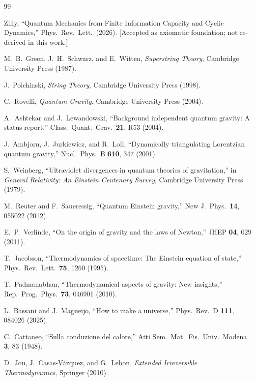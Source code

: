 \documentclass[aps,prd,twocolumn,showpacs,superscriptaddress,preprintnumbers]{revtex4-2}
\begin{document}
\begin{thebibliography}{99}

Zilly, ``Quantum Mechanics from Finite Information Capacity and Cyclic Dynamics,''
Phys.\ Rev.\ Lett.\ (2026).
[Accepted as axiomatic foundation; not re-derived in this work.]

M.~B.~Green, J.~H.~Schwarz, and E.~Witten,
\textit{Superstring Theory},
Cambridge University Press (1987).

J.~Polchinski,
\textit{String Theory},
Cambridge University Press (1998).

C.~Rovelli,
\textit{Quantum Gravity},
Cambridge University Press (2004).

A.~Ashtekar and J.~Lewandowski,
``Background independent quantum gravity: A status report,''
Class.\ Quant.\ Grav.\ \textbf{21}, R53 (2004).

J.~Ambjorn, J.~Jurkiewicz, and R.~Loll,
``Dynamically triangulating Lorentzian quantum gravity,''
Nucl.\ Phys.\ B \textbf{610}, 347 (2001).

S.~Weinberg,
``Ultraviolet divergences in quantum theories of gravitation,''
in \textit{General Relativity: An Einstein Centenary Survey},
Cambridge University Press (1979).

M.~Reuter and F.~Saueressig,
``Quantum Einstein gravity,''
New J.\ Phys.\ \textbf{14}, 055022 (2012).

E.~P.~Verlinde,
``On the origin of gravity and the laws of Newton,''
JHEP \textbf{04}, 029 (2011).

T.~Jacobson,
``Thermodynamics of spacetime: The Einstein equation of state,''
Phys.\ Rev.\ Lett.\ \textbf{75}, 1260 (1995).

T.~Padmanabhan,
``Thermodynamical aspects of gravity: New insights,''
Rep.\ Prog.\ Phys.\ \textbf{73}, 046901 (2010).

L.~Bassani and J.~Magueijo,
``How to make a universe,''
Phys.\ Rev.\ D \textbf{111}, 084026 (2025).

C.~Cattaneo,
``Sulla conduzione del calore,''
Atti Sem.\ Mat.\ Fis.\ Univ.\ Modena \textbf{3}, 83 (1948).

D.~Jou, J.~Casas-V{\'a}zquez, and G.~Lebon,
\textit{Extended Irreversible Thermodynamics},
Springer (2010).


\end{thebibliography}
\end{document}
